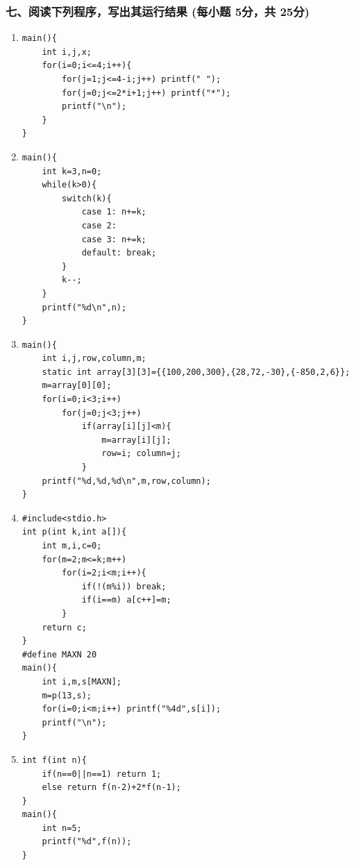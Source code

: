 \documentclass[12pt,a4paper]{article}
\begin{document}
\subsubsection*{七、阅读下列程序，写出其运行结果 (每小题 5分，共 25分)}
\begin{enumerate}
    \item 
    \begin{verbatim}
main(){
    int i,j,x;
    for(i=0;i<=4;i++){
        for(j=1;j<=4-i;j++) printf(" ");
        for(j=0;j<=2*i+1;j++) printf("*");
        printf("\n");
    }
}
    \end{verbatim}
    
    \item 
    \begin{verbatim}
main(){
    int k=3,n=0;
    while(k>0){
        switch(k){
            case 1: n+=k;
            case 2:
            case 3: n+=k;
            default: break;
        }
        k--;
    }
    printf("%d\n",n);
}
    \end{verbatim}
    
    \item 
    \begin{verbatim}
main(){
    int i,j,row,column,m;
    static int array[3][3]={{100,200,300},{28,72,-30},{-850,2,6}};
    m=array[0][0];
    for(i=0;i<3;i++)
        for(j=0;j<3;j++)
            if(array[i][j]<m){
                m=array[i][j];
                row=i; column=j;
            }
    printf("%d,%d,%d\n",m,row,column);
}
    \end{verbatim}
    
    \item 
    \begin{verbatim}
#include<stdio.h>
int p(int k,int a[]){
    int m,i,c=0;
    for(m=2;m<=k;m++)
        for(i=2;i<m;i++){
            if(!(m%i)) break;
            if(i==m) a[c++]=m;
        }
    return c;
}
#define MAXN 20
main(){
    int i,m,s[MAXN];
    m=p(13,s);
    for(i=0;i<m;i++) printf("%4d",s[i]);
    printf("\n");
}
    \end{verbatim}
    
    \item 
    \begin{verbatim}
int f(int n){
    if(n==0||n==1) return 1;
    else return f(n-2)+2*f(n-1);
}
main(){
    int n=5;
    printf("%d",f(n));
}
    \end{verbatim}
\end{enumerate}
\end{document}

